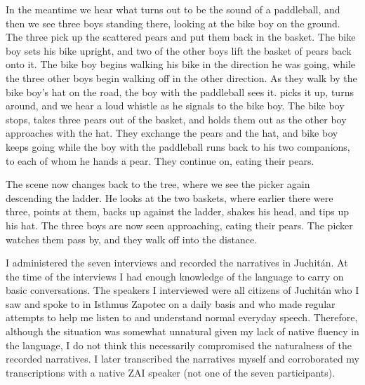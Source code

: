 {In the meantime we hear what turns out to be the sound of a paddleball, and then we see three boys standing there, looking at the bike boy on the ground. The three pick up the scattered pears and put them back in the basket. The bike boy sets his bike upright, and two of the other boys lift the basket of pears back onto it. The bike boy begins walking his bike in the direction he was going, while the three other boys begin walking off in the other direction. As they walk by the bike boy's hat on the road, the boy with the paddleball sees it. picks it up, turns around, and we hear a loud whistle as he signals to the bike boy. The bike boy stops, takes three pears out of the basket, and holds them out as the other boy approaches with the hat. They exchange the pears and the hat, and bike boy keeps going while the boy with the paddleball runs back to his two companions, to each of whom he hands a pear. They continue on, eating their pears. 

The scene now changes back to the tree, where we see the picker again descending the ladder. He looks at the two baskets, where earlier there were three, points at them, backs up against the ladder, shakes his head, and tips up his hat. The three boys are now seen approaching, eating their pears. The picker watches them pass by, and they walk off into the distance.} 

I administered the seven interviews and recorded the narratives in Juchit\'{a}n. At the time of the interviews I had enough knowledge of the language to carry on basic conversations. The speakers I interviewed were all citizens of Juchit\'{a}n who I saw and spoke to in Isthmus Zapotec on a daily basis and who made regular attempts to help me listen to and understand normal everyday speech. Therefore, although the situation was somewhat unnatural given my lack of native fluency in the language, I do not think this necessarily compromised the naturalness of the recorded narratives. I later transcribed the narratives myself and corroborated my transcriptions with a native ZAI speaker (not one of the seven participants). 
 
